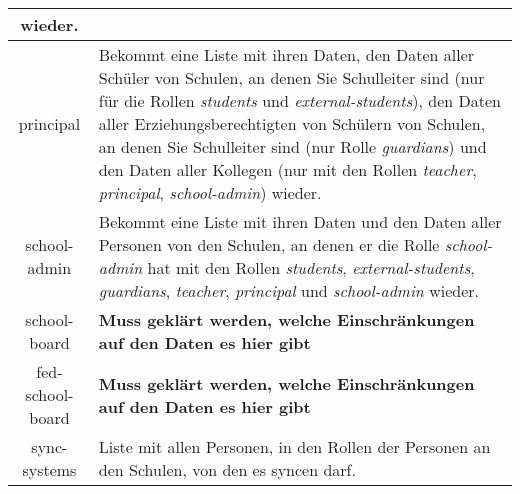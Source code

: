 \begin{longtable}{|c|p{}|}
					wieder.\\ \hline
principal & Bekommt eine Liste mit ihren Daten,
            den Daten aller Schüler von Schulen, an denen Sie Schulleiter sind (nur für die Rollen \textit{students} und \textit{external-students}),
						den Daten aller Erziehungsberechtigten von Schülern von Schulen, an denen Sie Schulleiter sind (nur Rolle \textit{guardians}) und
					  den Daten aller Kollegen (nur mit den Rollen \textit{teacher}, \textit{principal}, \textit{school-admin})
						wieder.\\ \hline
school-admin & Bekommt eine Liste mit ihren Daten und
               den Daten aller Personen von den Schulen, an denen er die Rolle \textit{school-admin} hat mit den Rollen \textit{students}, \textit{external-students}, \textit{guardians}, \textit{teacher}, \textit{principal} und \textit{school-admin} wieder.  \\ \hline
school-board & \textcolor[rgb]{1,0.41,0.13}{\textbf{Muss geklärt werden, welche Einschränkungen auf den Daten es hier gibt}} \\ \hline
fed-school-board & \textcolor[rgb]{1,0.41,0.13}{\textbf{Muss geklärt werden, welche Einschränkungen auf den Daten es hier gibt}} \\ \hline
sync-systems & Liste mit allen Personen, in den Rollen der Personen an den Schulen, von den es syncen darf. \\ \hline

	\end{longtable}
